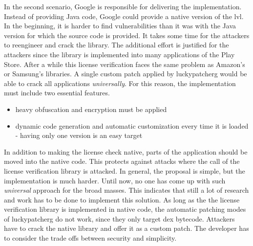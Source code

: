 In the second scenario, Google is responsible for delivering the implementation.
Instead of providing Java code, Google could provide a native version of the \gls{lvl}.
In the beginning, it is harder to find vulnerabilities than it was with the Java version for which the source code is provided.
It takes some time for the attackers to reengineer and crack the library.
The additional effort is justified for the attackers since the library is implemented into many applications of the Play Store.
After a while this license verification faces the same problem as Amazon's or Samsung's libraries.
A single custom patch applied by \gls{luckypatcherg} would be able to crack all applications \textit{universally}.
For this reason, the implementation must include two essential features.
\begin{itemize}
\item heavy obfuscation and encryption must be applied
\item dynamic code generation and automatic customization every time it is loaded - having only one version is an easy target
\end{itemize}
In addition to making the license check native, parts of the application should be moved into the native code.
This protects against attacks where the call of the license verification library is attacked.
\newline
\newline
In general, the proposal is simple, but the implementation is much harder.
Until now, no one has come up with such \textit{universal} approach for the broad masses.
This indicates that still a lot of research and work has to be done to implement this solution.
\newline
As long as the the license verification library is implemented in native code, the automatic patching modes of \gls{luckypatcherg} do not work, since they only target dex bytecode.
Attackers have to crack the native library and offer it as a custom patch.
The developer has to consider the trade offs between security and simplicity.

